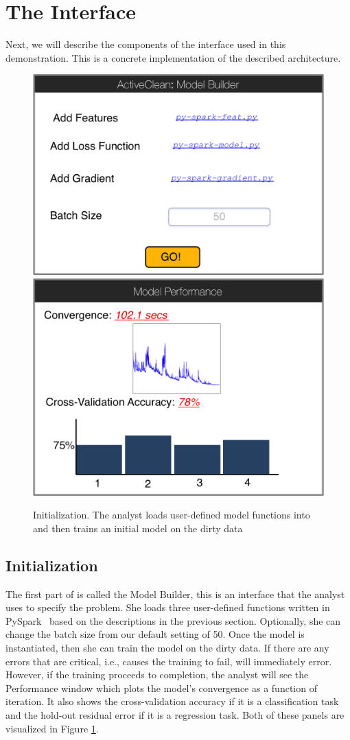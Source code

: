 \section{The Interface}
Next, we will describe the components of the \sys interface used in this demonstration. This is a concrete implementation of the described architecture.


\begin{figure}[t]
\centering
 \includegraphics[width=0.48\columnwidth]{figs/interface1.png}
 \includegraphics[width=0.48\columnwidth]{figs/interface2.png}
 \caption{Initialization. The analyst loads user-defined model functions into \sys and then trains an initial model on the dirty data \label{irun}}
\end{figure}

\subsection{Initialization}
The first part of \sys is called the \textsf{Model Builder}, this is an interface that the analyst uses to specify the problem.
She loads three user-defined functions written in PySpark~\cite{pyspark} based on the descriptions in the previous section.
Optionally, she can change the batch size from our default setting of 50.
Once the model is instantiated, then she can train the model on the dirty data.
If there are any errors that are critical, i.e., causes the training to fail, \sys will immediately error.
However, if the training proceeds to completion, the analyst will see the \textsf{Performance} window which plots the model's convergence as a function of iteration.
It also shows the cross-validation accuracy if it is a classification task and the hold-out residual error if it is a regression task.
Both of these panels are visualized in Figure \ref{irun}.

